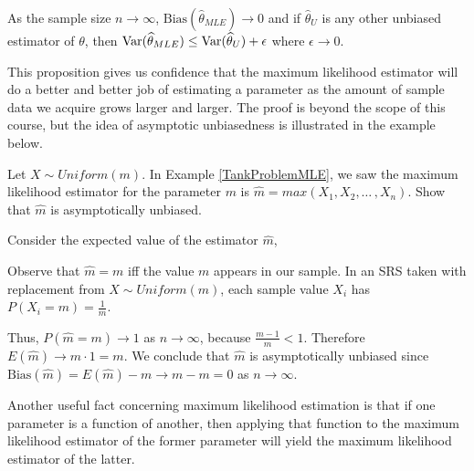 \begin{prop} As the sample size $n \to \infty$, $\text{Bias}(\widehat{\theta}_{MLE}) \to 0$ and if $\widehat{\theta}_{U}$ is any other unbiased estimator of $\theta$, then $\operatorname{Var}(\widehat{\theta}_{MLE}) \leq \operatorname{Var}(\widehat{\theta}_{U}) + \epsilon$ where $\epsilon \to 0$.
\end{prop}

This proposition gives us confidence that the maximum likelihood estimator will do a better and better job of estimating a parameter as the amount of sample data we acquire grows larger and larger. The proof is beyond the scope of this course, but the idea of asymptotic unbiasedness is illustrated in the example below.
\begin{examp} Let $X \sim Uniform(m)$. In Example \ref{TankProblemMLE}, we saw the maximum likelihood estimator for the parameter $m$ is $\widehat{m} = max(X_1,X_2,\dots\,,X_n)$. Show that $\widehat{m}$ is asymptotically unbiased.
\par
\noindent Consider the expected value of the estimator $\widehat{m}$,
\par
\noindent Observe that $\widehat{m} =  m$ iff the value $m$ appears in our sample. In an SRS taken with replacement from $X \sim Uniform(m)$, each sample value $X_i$ has $P(X_i = m) = \frac{1}{m}$.
\par
\noindent Thus, $P(\widehat{m} = m) \to 1$ as $n \to \infty$, because $\frac{m-1}{m} < 1$. Therefore $E(\widehat{m}) \to m \cdot 1 = m$. We conclude that $\widehat{m}$ is asymptotically unbiased since $\text{Bias}(\widehat{m}) = E(\widehat{m}) - m  \to m - m = 0$ as $n \to \infty$.
\end{examp}
\par
Another useful fact concerning maximum likelihood estimation is that if one parameter is a function of another, then applying that function to the maximum likelihood estimator of the former parameter will yield the maximum likelihood estimator of the latter.

